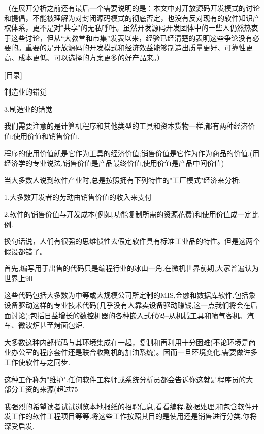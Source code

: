 \documentclass[a4paper,12pt,UTF8,twoside]{ctexbook}
\begin{document}
（在展开分析之前还有最后一个需要说明的是：本文中对开放源码开发模式的讨论和提倡，不能被理解为对封闭源码模式的彻底否定，也没有反对现有的软件知识产权体系，更不是对"共享"的无私呼吁。虽然开发源码开发团体中的一些人仍然热衷于这些讨论，但从“大教堂和市集”发表以来，经验已经清楚的表明这些争论没有必要的。重要的是开放源码的开发模式和经济效益能够制造出质量更好、可靠性更高、成本更低、可以选择的方案更多的好产品来。）

[目录]

制造业的错觉

3.制造业的错觉

我们需要注意的是计算机程序和其他类型的工具和资本货物一样,都有两种经济价值:使用价值和销售价值.


程序的使用价值就是它作为工具的经济价值;销售价值是它作为作为商品的价值.(用经济学的专业说法,销售价值是产品最终价值,使用价值是产品中间价值)


当大多数人说到软件产业时,总是按照拥有下列特性的"工厂模式"经济来分析:


1.大多数开发者的劳动由销售价值的收入来支付


2.软件的销售价值与开发成本(例如,功能复制所需的资源花费)和使用价值成一定比例.


换句话说，人们有很强的思维惯性去假定软件具有标准工业品的特性。但是这两个假设都错了。


首先,编写用于出售的代码只是编程行业的冰山一角.在微机世界前期,大家普遍认为世界上90%


这些代码包括大多数为中等或大规模公司所定制的MIS,金融和数据库软件.包括象设备驱动这样的专业技术代码(几乎没有人靠卖设备驱动赚钱,这一点我们将会在后面讨论);包括日益增长的数控机器的各种嵌入式代码--从机械工具和喷气客机、汽车、微波炉甚至烤面包炉.


大多数这种内部代码与其环境集成在一起，复制和再利用十分困难(不论环境是商业办公室的程序套件还是联合收割机的加油系统)。因而一旦环境变化,需要做许多工作使软件与之同步.


这种工作称为"维护".任何软件工程师或系统分析员都会告诉你这就是程序员的大部分工资的来源(超过75%


我强烈的希望读者试试浏览本地报纸的招聘信息,看看编程.数据处理,和包含软件开发工作的软件工程项目等等.将这些工作按照其目的是使用还是销售进行分类,你将深受启发.
\end{document}
